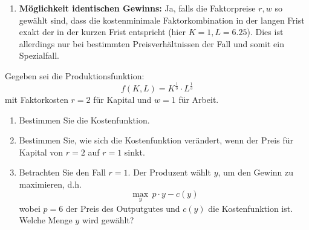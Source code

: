 \begin{solution}
\begin{enumerate}
		\item \textbf{Möglichkeit identischen Gewinns:}
		      Ja, falls die Faktorpreise \(r, w\) so gewählt sind, dass die kostenminimale Faktorkombination in der langen Frist exakt der in der kurzen Frist entspricht (hier \(K=1, L=6.25\)). Dies ist allerdings nur bei bestimmten Preisverhältnissen der Fall und somit ein Spezialfall.
	\end{enumerate}

\end{solution}


\begin{question}
	Gegeben sei die Produktionsfunktion:
	\[
		f(K, L) = K^{\frac{1}{3}} \cdot L^{\frac{1}{3}}
	\]
	mit Faktorkosten \( r = 2 \) für Kapital und \( w = 1 \) für Arbeit.

	\begin{enumerate}
		\item Bestimmen Sie die Kostenfunktion.
		\item Bestimmen Sie, wie sich die Kostenfunktion verändert, wenn der Preis für Kapital von \( r = 2 \) auf \( r = 1 \) sinkt.
		\item Betrachten Sie den Fall \( r = 1 \). Der Produzent wählt \( y \), um den Gewinn zu maximieren, d.h.
		      \[
			      \max_{y} \, p \cdot y - c(y)
		      \]
		      wobei \( p = 6 \) der Preis des Outputgutes und \( c(y) \) die Kostenfunktion ist. Welche Menge \( y \) wird gewählt?
	\end{enumerate}

\end{question}
